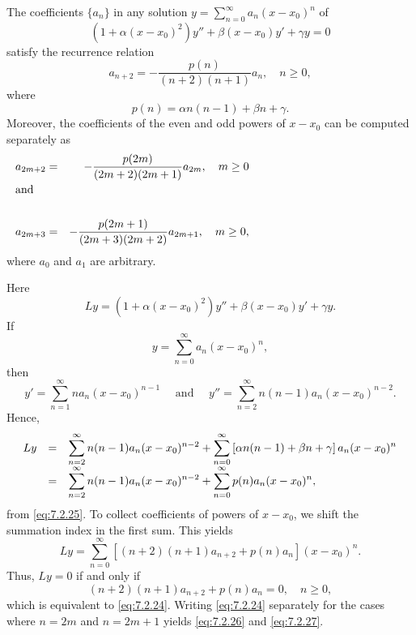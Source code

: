 \begin{theorem}
  \color{blue}
  \label{thmtype:7.2.2} The coefficients $\{a_{n}\}$ in any solution
  $y=\sum_{n=0}^{\infty}a_{n}(x-x_{0})^{n}$ of
  \begin{equation}
    \label{eq:7.2.23}\left(1+\alpha(x-x_{0})^{2}\right)y''+\beta(x-x_{0})y'+\gamma y=0
  \end{equation}
  satisfy the recurrence relation
  \begin{equation}
    \label{eq:7.2.24}a_{n+2}=-\frac{p(n)}{(n+2)(n+1)}a_{n},\quad n\ge0,
  \end{equation}
  where
  \begin{equation}
    \label{eq:7.2.25}p(n)=\alpha n(n-1)+\beta n+\gamma.
  \end{equation}
  Moreover, the coefficients of the even and odd powers of $x-x_{0}$ can be computed separately as
  \begin{eqnarray}
    a_{2m+2}                                     & = & -\frac{p(2m)}{(2m+2)(2m+1)}a_{2m},\quad m\ge0\label{eq:7.2.26} \\
    \noalign{\hspace*{-15pt}\mbox{and}}\nonumber                                                                      \\
    a_{2m+3}                                     & = & -\frac{p(2m+1)}{(2m+3)(2m+2)}a_{2m+1},\quad m\ge0,\label{eq:7.2.27}
  \end{eqnarray}
  where $a_{0}$ and $a_{1}$ are arbitrary.
\end{theorem}

\proof Here
\[
  Ly=\left(1+\alpha(x-x_{0})^{2}\right)y''+\beta(x-x_{0})y'+\gamma y.
\]
If
\[
  y=\sum_{n=0}^{\infty}a_{n}(x-x_{0})^{n},
\]
then
\[
  y'=\sum_{n=1}^{\infty}na_{n}(x-x_{0})^{n-1}\quad\mbox{ and }\quad y''=\sum_{n=2}^{\infty}n(n-1)a_{n}(x-x_{0})^{n-2}.
\]
Hence,
\[
  \begin{array}{ccl}
    Ly & = & \displaystyle{\sum_{n=2}^{\infty}n(n-1)a_{n}(x-x_{0})^{n-2}+ \sum_{n=0}^{\infty}\left[\alpha n(n-1) +\beta n+\gamma\right]a_{n}(x-x_{0})^{n}} \\[2\jot]
       & = & \displaystyle{\sum_{n=2}^{\infty}n(n-1)a_{n}(x-x_{0})^{n-2}+\sum_{n=0}^{\infty} p(n)a_{n}(x-x_{0})^{n}},
  \end{array}
\]
from \eqref{eq:7.2.25}. To collect coefficients of powers of $x-x_{0}$, we shift the summation index
in the first sum. This yields
\[
  Ly=\sum_{n=0}^{\infty}\left[(n+2)(n+1)a_{n+2}+p(n)a_{n}\right](x-x_{0})^{n}.
\]
Thus, $Ly=0$ if and only if
\[
  (n+2)(n+1)a_{n+2}+p(n)a_{n}=0,\quad n\ge0,
\]
which is equivalent to \eqref{eq:7.2.24}. Writing \eqref{eq:7.2.24} separately for the cases where
$n=2m$ and $n=2m+1$ yields \eqref{eq:7.2.26} and \eqref{eq:7.2.27}.

